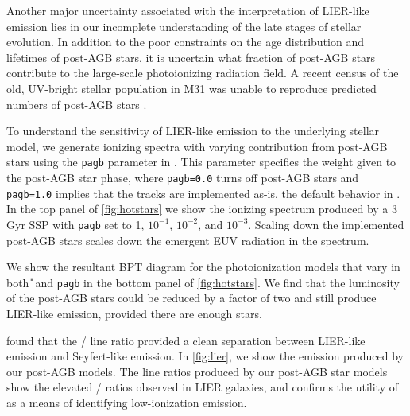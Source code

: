 Another major uncertainty associated with the interpretation of LIER-like emission lies in our incomplete understanding of the late stages of stellar evolution. In addition to the poor constraints on the age distribution and lifetimes of post-AGB stars, it is uncertain what fraction of post-AGB stars contribute to the large-scale photoionizing radiation field. A recent census of the old, UV-bright stellar population in M31 was unable to reproduce predicted numbers of post-AGB stars \citep{Brown2008}. 

To understand the sensitivity of LIER-like emission to the underlying stellar model, we generate ionizing spectra with varying contribution from post-AGB stars using the {\tt pagb} parameter in \FSPS. This parameter specifies the weight given to the post-AGB star phase, where {\tt pagb=0.0} turns off post-AGB stars and {\tt pagb=1.0} implies that the \citet{Vassiliadis} tracks are implemented as-is, the default behavior in \FSPS. In the top panel of \ref{fig:hotstars} we show the ionizing spectrum produced by a 3 Gyr SSP with {\tt pagb} set to 1, $10^{-1}$, $10^{-2}$, and $10^{-3}$. Scaling down the implemented post-AGB stars scales down the emergent EUV radiation in the spectrum.

We show the resultant BPT diagram for the photoionization models that vary in both \U{} and {\tt pagb} in the bottom panel of \ref{fig:hotstars}. We find that the luminosity of the post-AGB stars could be reduced by a factor of two and still produce LIER-like emission, provided there are enough stars.

\citet{Belfiore16} found that the \sii{}/\ha{} line ratio provided a clean separation between LIER-like emission and Seyfert-like emission. In \ref{fig:lier}, we show the \sii{} emission produced by our post-AGB models. The line ratios produced by our post-AGB star models show the elevated \sii{}/\ha{} ratios observed in LIER galaxies, and confirms the utility of \sii{} as a means of identifying low-ionization emission.

